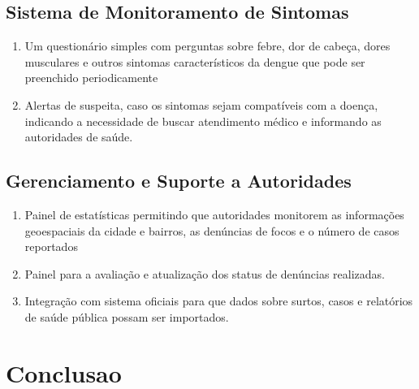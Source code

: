 \documentclass[a5paper, 12pt]{article}
\begin{document}
\subsection{Sistema de Monitoramento de Sintomas}
\begin{enumerate}
    \item Um questionário simples com perguntas sobre febre, dor de cabeça, dores musculares e outros sintomas característicos da dengue que pode ser preenchido periodicamente
    \item Alertas de suspeita, caso os sintomas sejam compatíveis com a doença, indicando a necessidade de buscar atendimento médico e informando as autoridades de saúde.
\end{enumerate}
\subsection{Gerenciamento e Suporte a Autoridades}
\begin{enumerate}
    \item Painel de estatísticas permitindo que autoridades monitorem as informações geoespaciais da cidade e bairros, as denúncias de focos e o número de casos  reportados
    \item Painel para a avaliação e atualização dos status de denúncias realizadas.
    \item Integração com sistema oficiais para que dados sobre surtos, casos e relatórios de saúde pública possam ser importados.
\end{enumerate}
\section{Conclusao}
\end{document}

